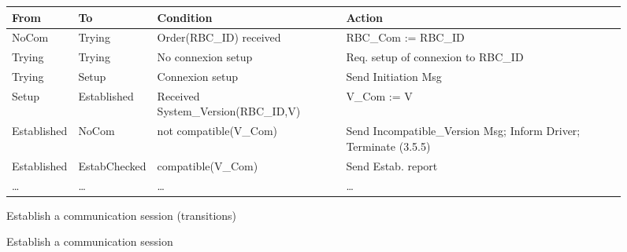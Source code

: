 \documentclass{template/openetcs_article}
\begin{document}
\begin{figure}
\centering
\small
\begin{tabular}{|l|l||p{3.5cm}|p{3.5cm}|}
\hline
\bf From & \bf To & \bf Condition & \bf Action \\
\hline
NoCom & Trying & Order(RBC\_ID) received & RBC\_Com := RBC\_ID \\
\hline
Trying & Trying & No connexion setup & Req. setup of connexion to RBC\_ID \\
\hline
Trying & Setup & Connexion setup & Send Initiation Msg \\
\hline
Setup & Established & Received System\_Version(RBC\_ID,V)  & V\_Com := V  \\
\hline
Established & NoCom & not compatible(V\_Com)  & Send Incompatible\_Version Msg; Inform Driver; Terminate (3.5.5) \\
\hline
Established & EstabChecked & compatible(V\_Com) & Send Estab. report \\
\hline

\dots & \dots & \dots & \dots  \\
\hline
\end{tabular}
\normalsize
\caption{Establish a communication session (transitions)}
\label{fig:establish_tab}
\end{figure}

\begin{figure}
  \centering
  \caption{Establish a communication session}
  \label{fig:establish}
\end{figure}
\end{document}
